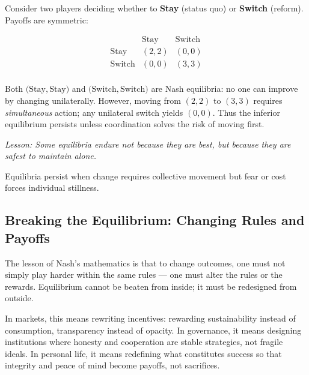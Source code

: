 \documentclass[12pt,twoside]{book}
\begin{document}
\begin{tcolorbox}[colback=gray!5,colframe=gray!60,boxrule=0.4pt,arc=1mm,
title=Mathematical Interlude: A Simple Coordination Trap]

Consider two players deciding whether to \textbf{Stay} (status quo) or \textbf{Switch} (reform). Payoffs are symmetric:

\[
\begin{array}{c|cc}
 & \text{Stay} & \text{Switch} \\
\hline
\text{Stay}   & (2,2) & (0,0) \\
\text{Switch} & (0,0) & (3,3) \\
\end{array}
\]

Both $\big(\text{Stay},\text{Stay}\big)$ and $\big(\text{Switch},\text{Switch}\big)$ are Nash equilibria: no one can improve by changing unilaterally.  
However, moving from $(2,2)$ to $(3,3)$ requires \emph{simultaneous} action; any unilateral switch yields $(0,0)$.  
Thus the inferior equilibrium persists unless coordination solves the risk of moving first.
\end{tcolorbox}

\textit{Lesson: Some equilibria endure not because they are best, but because they are safest to maintain alone.} \\

\begin{keyidea}
Equilibria persist when change requires collective movement but fear or cost forces individual stillness.
\end{keyidea}

\subsection*{Breaking the Equilibrium: Changing Rules and Payoffs}
The lesson of Nash’s mathematics is that to change outcomes, one must not simply play harder within the same rules — one must alter the rules or the rewards.  
Equilibrium cannot be beaten from inside; it must be redesigned from outside.

In markets, this means rewriting incentives: rewarding sustainability instead of consumption, transparency instead of opacity.  
In governance, it means designing institutions where honesty and cooperation are stable strategies, not fragile ideals.  
In personal life, it means redefining what constitutes success so that integrity and peace of mind become payoffs, not sacrifices.
\end{document}
